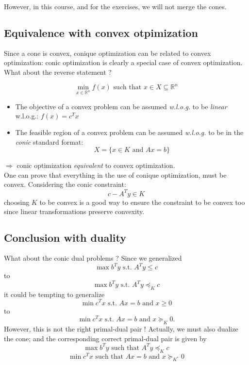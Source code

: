 \documentclass[10pt,a4paper]{article}
\begin{document}
\vspace{0.4cm}  \noindent However, in this course, and for the exercises, we will not merge the cones. \\

\noindent \subsection{Equivalence with convex otpimization} 
\noindent Since a cone is convex, conique optimization can be related to convex optimization: conic optimization is clearly a special case of convex optimization. What about the reverse statement ?

\[ \min_{x \in \mathbb{R}^n} f(x) \text{ such that } x \in X \subseteq
\mathbb{R}^n \]

\begin{itemize}
\item The objective of a convex problem can be assumed
\emph{w.l.o.g.} to be \emph{linear} w.l.o.g.: $f(x) = c^T x$

\item The feasible region of a convex problem can be assumed
\emph{w.l.o.g.} to be in the \emph{conic} standard format: \[ X
= \{ x \in K \text{ and } A x = b \} \]
\end{itemize}

$\Rightarrow$ conic optimization \emph{equivalent} to convex
optimization. \\

\vspace{0.15cm}\noindent One can prove that everything in the use of conique optimization, must be convex. Considering the conic constraint: 
\begin{equation}
c-A^Ty \in K  \nonumber 
\end{equation}
choosing $K$ to be convex is a good way to ensure the constraint to be convex too since linear transformations preserve convexity. \\

\noindent \subsection{Conclusion with duality}
What about the conic dual problems ? Since we generalized
\[ \max b^T y \text{  s.t.  } A^T y \leq c \] to
\[ \max b^T y \text{  s.t.  } A^T y \preceq_K c \] it could be tempting to generalize
\[ \min c^T x \text{  s.t.  } Ax = b \text{ and } x \geq 0 \]
to
\[ \min c^T x \text{  s.t.  } Ax = b \text{ and } x \succeq_K 0 .\]
However, this is not the right primal-dual pair ! Actually, we must also dualize the cone; and the corresponding correct primal-dual pair is given by 
\vspace{0.3cm} \[ \max b^T y \text{ such that } A^T y \preceq_K c \]
\[ \min c^T x \text{ such that } Ax = b \text{ and } x \succeq_{K^*} 0 \]
\end{document}
